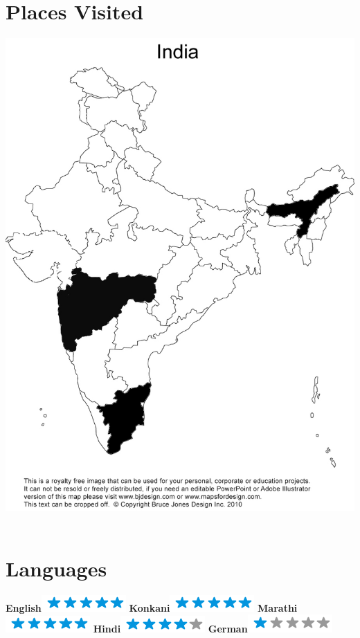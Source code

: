 \documentclass[]{friggeri-cv}
\begin{document}
\begin{aside}
~
~
~
  \section{Places Visited}
    \includegraphics[scale=0.25]{img/india.jpg}
    ~
  \section{Languages}
    \textbf{English}\includegraphics[scale=0.40]{img/5stars.png}
    \textbf{Konkani}\includegraphics[scale=0.40]{img/5stars.png}
    \textbf{Marathi}\includegraphics[scale=0.40]{img/5stars.png}
    \textbf{Hindi}\includegraphics[scale=0.40]{img/4stars.png}
    \textbf{German}\includegraphics[scale=0.40]{img/1stars.png}
\end{aside}
\end{document}
